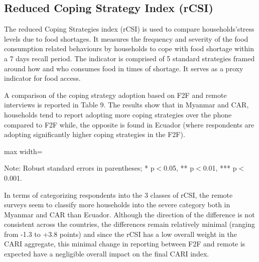 \documentclass[11pt,harvard]{article}
\begin{document}
\subsection{Reduced Coping Strategy Index (rCSI)}
	
The reduced Coping Strategies index (rCSI) is used to compare households’stress  levels due to food shortages. It measures the frequency and severity of the food consumption related behaviours by households to cope with food shortage within a 7 days recall period. The indicator is comprised of 5 standard strategies framed around how and who consumes food in times of shortage. It serves as a proxy indicator for food access.

A comparison of the coping strategy adoption based on F2F and remote interviews is reported in Table 9. The results show that in Myanmar and CAR, households tend to report adopting more  coping strategies over the phone compared to F2F while, the opposite is found in Ecuador (where respondents are adopting significantly higher coping strategies in the F2F).
	
	\begin{table}[htbp]
		\centering
		\begin{adjustbox}{max width=\textwidth}
			\begin{threeparttable}
				\caption{Impact of Survey Modality on Reduced Coping Strategy Index Classification}
				\scriptsize
				 
				\label{tab:rCSI_Modality_All_Country}
				\begin{tablenotes}
					\item Note: Robust standard errors in parentheses; * p$<$0.05, ** p$<$0.01, *** p$<$0.001. 
				\end{tablenotes}
			\end{threeparttable}
		\end{adjustbox}
	\end{table}
	
In terms of categorizing respondents into the 3 classes of rCSI, the remote surveys seem to classify more households into the severe category both in Myanmar and CAR than Ecuador. Although the direction of the difference is not consistent across the countries, the differences remain relatively minimal (ranging from -1.3 to +3.8 points) and since the rCSI has a low overall weight in the CARI aggregate, this minimal change in reporting between F2F and remote is expected have a negligible overall impact on the final CARI index. 
	
\end{document}
